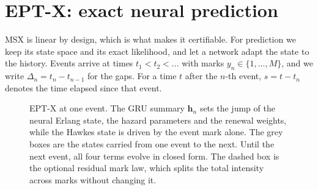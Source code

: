 \section{EPT-X: exact neural prediction}\label{sec:eptx}

MSX is linear by design, which is what makes it certifiable. For prediction we keep its state space
and its exact likelihood, and let a network adapt the state to the history. Events arrive at times $t_1<t_2<\dots$ with marks
$y_n\in\{1,\dots,M\}$, and we write $\Delta_n=t_n-t_{n-1}$ for the gaps. For a time $t$ after the
$n$-th event, $s=t-t_n$ denotes the time elapsed since that event.

\begin{figure}[t]\centering

\caption{EPT-X at one event. The GRU summary $\bm h_n$ sets the jump of the neural Erlang state,
the hazard parameters and the renewal weights, while the Hawkes state is driven by the event mark
alone. The grey boxes are the states carried from one event to the next. Until the next event,
all four terms evolve in closed form. The dashed box is the optional residual mark law, which
splits the total intensity across marks without changing it.}\label{fig:eptx}
\end{figure}

